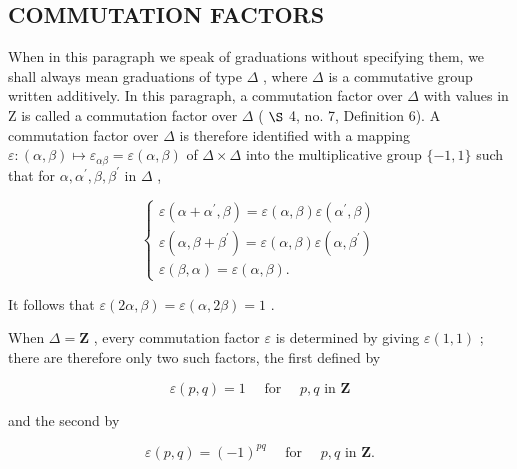 \subsection{COMMUTATION FACTORS}

When in this paragraph we speak of graduations without specifying them, we shall always mean graduations of type \(\Delta\) , where \(\Delta\) is a commutative group written additively. In this paragraph, a commutation factor over \(\Delta\) with values in Z is called a commutation factor over \(\Delta\) ( \(\S\) 4, no. 7, Definition 6). A commutation factor over \(\Delta\) is therefore identified with a mapping \(\varepsilon\colon(\alpha,\beta)\mapsto\varepsilon_{\alpha\beta}=\varepsilon(\alpha,\beta)\) of \(\Delta\times\Delta\) into the multiplicative group \(\{-1,1\}\) such that for \(\alpha,\alpha^{\prime},\beta,\beta^{\prime}\) in \(\Delta\) ,

\[
\left\{ \begin{array}{l} \varepsilon (\alpha + \alpha^ {\prime}, \beta) = \varepsilon (\alpha , \beta) \varepsilon (\alpha^ {\prime}, \beta) \\ \varepsilon (\alpha , \beta + \beta^ {\prime}) = \varepsilon (\alpha , \beta) \varepsilon (\alpha , \beta^ {\prime}) \\ \varepsilon (\beta , \alpha) = \varepsilon (\alpha , \beta). \end{array} \right.\tag{1}
\]

It follows that \(\varepsilon(2\alpha, \beta) = \varepsilon(\alpha, 2\beta) = 1\) .

When \(\Delta = \mathbf{Z}\) , every commutation factor \(\varepsilon\) is determined by giving \(\varepsilon(1, 1)\) ; there are therefore only two such factors, the first defined by

\[
\varepsilon (p, q) = 1 \quad \text { for } \quad p, q \text { in } \mathbf {Z}\tag{2}
\]

and the second by

\[
\varepsilon (p, q) = (- 1) ^ {p q} \quad \text { for } \quad p, q \text { in } \mathbf {Z}.\tag{3}
\]

